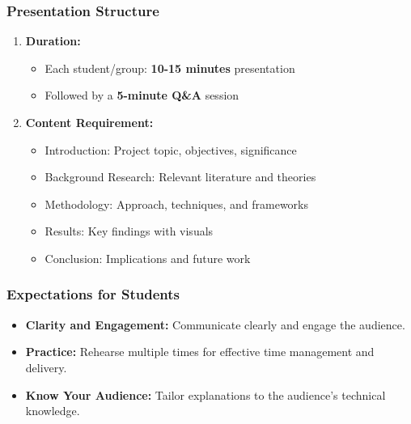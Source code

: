 \documentclass[aspectratio=169]{beamer}
\begin{document}
\begin{frame}[fragile]
    \frametitle{Presentation Structure}
    \begin{enumerate}
        \item \textbf{Duration:}
            \begin{itemize}
                \item Each student/group: \textbf{10-15 minutes} presentation
                \item Followed by a \textbf{5-minute Q\&A} session
            \end{itemize}
        \item \textbf{Content Requirement:}
            \begin{itemize}
                \item Introduction: Project topic, objectives, significance
                \item Background Research: Relevant literature and theories
                \item Methodology: Approach, techniques, and frameworks
                \item Results: Key findings with visuals
                \item Conclusion: Implications and future work
            \end{itemize}
    \end{enumerate}
\end{frame}

\begin{frame}[fragile]
    \frametitle{Expectations for Students}
    \begin{itemize}
        \item \textbf{Clarity and Engagement:} Communicate clearly and engage the audience.
        \item \textbf{Practice:} Rehearse multiple times for effective time management and delivery.
        \item \textbf{Know Your Audience:} Tailor explanations to the audience's technical knowledge.
    \end{itemize}
\end{frame}
\end{document}
